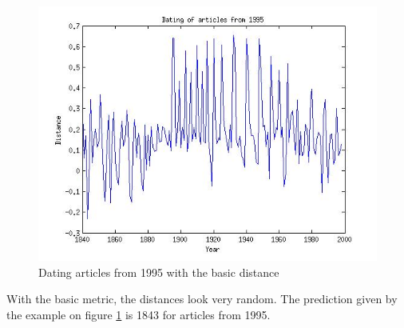 \begin{figure}[H]
\begin{minipage}[b]{0.3\linewidth}
    \end{minipage}\hfill
    \begin{minipage}[b]{0.3\linewidth}
	\includegraphics[scale=0.25]{Pictures/date_articles/distance1/dating1995_corrected.jpg}
        \caption{Dating articles from 1995 with the basic distance}
    \end{minipage}
    \label{date_d1}
\end{figure}
With the basic metric, the distances look very random. The prediction given by the example on figure \ref{date_d1} is 1843 for articles from 1995.